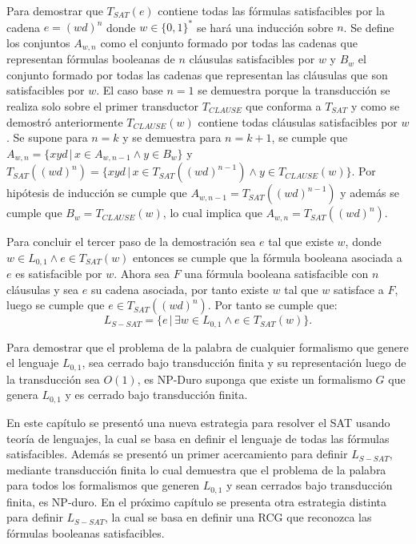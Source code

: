 \documentclass[12pt]{article}
\begin{document}
Para demostrar que $T_{SAT}(e)$ contiene todas las fórmulas satisfacibles por la cadena $e=(wd)^n$ donde $w\in\{0,1\}^*$ se hará una inducción sobre $n$. Se define los conjuntos $A_{w,n}$ como el conjunto formado por todas las cadenas que representan fórmulas booleanas de $n$ cláusulas satisfacibles por $w$ y $B_w$ el conjunto formado por todas las cadenas que representan las cláusulas que son satisfacibles por $w$. El caso base $n=1$ se demuestra porque la transducción se realiza solo sobre el primer transductor $T_{CLAUSE}$ que conforma a $T_{SAT}$ y como se demostró anteriormente $T_{CLAUSE}(w)$ contiene todas cláusulas satisfacibles por $w$.  Se supone para $n=k$ y se demuestra para $n=k+1$, se cumple que $A_{w,n}=\{xyd\,|\,x\in A_{w,n-1} \wedge y\in B_w\}$ y $T_{SAT}((wd)^n)=\{xyd\,|\,x\in T_{SAT}((wd)^{n-1}) \wedge y\in T_{CLAUSE}(w)\}$. Por hipótesis de inducción se cumple que $A_{w,n-1}=T_{SAT}((wd)^{n-1})$ y además se cumple que $B_w=T_{CLAUSE}(w)$, lo cual implica que $A_{w,n}=T_{SAT}((wd)^n)$.

Para concluir el tercer paso de la demostración sea $e$ tal que existe $w$, donde $w \in L_{0,1} \wedge e \in T_{SAT}(w)$ entonces se cumple que la fórmula booleana asociada a $e$ es satisfacible por $w$. Ahora sea $F$ una fórmula booleana satisfacible con $n$ cláusulas y sea $e$ su cadena asociada, por tanto existe $w$ tal que $w$ satisface a $F$, luego se cumple que $e\in T_{SAT}((wd)^n)$. Por tanto se cumple que:
$$L_{S-SAT} = \{e\,|\,\exists w \in L_{0,1} \wedge e \in T_{SAT}(w) \}.$$

Para demostrar que el problema de la palabra de cualquier formalismo que genere el lenguaje $L_{0,1}$, sea 
cerrado bajo transducción finita y su representación luego de la transducción sea $O(1)$, es NP-Duro suponga 
que existe un formalismo $G$ que genera $L_{0,1}$ y es cerrado bajo transducción finita.

En este capítulo se presentó una nueva estrategia para resolver el SAT usando teoría de lenguajes, la cual se basa en
definir el lenguaje de todas las fórmulas satisfacibles. Además se presentó un primer acercamiento para definir $L_{S-SAT}$, mediante
transducción finita lo cual demuestra que  el problema de la palabra para todos los formalismos que generen $L_{0,1}$ y sean cerrados bajo transducción
finita, es NP-duro. En el próximo capítulo se presenta otra estrategia distinta para definir $L_{S-SAT}$, la cual se basa
en definir una RCG que reconozca las fórmulas booleanas satisfacibles.
\end{document}
